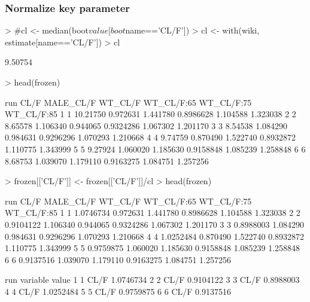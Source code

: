 \subsubsection{Normalize key parameter}
\begin{Schunk}
\begin{Sinput}
> #cl <- median(boot$value[boot$name=='CL/F'])
> cl <- with(wiki, estimate[name=='CL/F'])
> cl
\end{Sinput}
\begin{Soutput}
[1] 9.50754
\end{Soutput}
\begin{Sinput}
> head(frozen)
\end{Sinput}
\begin{Soutput}
  run     CL/F MALE_CL/F  WT_CL/F WT_CL/F:65 WT_CL/F:75 WT_CL/F:85
1   1 10.21750  0.972631 1.441780  0.8986628   1.104588   1.323038
2   2  8.65578  1.106340 0.944065  0.9324286   1.067302   1.201170
3   3  8.54538  1.084290 0.984631  0.9296296   1.070293   1.210668
4   4  9.74759  0.870490 1.522740  0.8932872   1.110775   1.343999
5   5  9.27924  1.060020 1.185630  0.9158848   1.085239   1.258848
6   6  8.68753  1.039070 1.179110  0.9163275   1.084751   1.257256
\end{Soutput}
\begin{Sinput}
> frozen[['CL/F']] <- frozen[['CL/F']]/cl
> head(frozen)
\end{Sinput}
\begin{Soutput}
  run      CL/F MALE_CL/F  WT_CL/F WT_CL/F:65 WT_CL/F:75 WT_CL/F:85
1   1 1.0746734  0.972631 1.441780  0.8986628   1.104588   1.323038
2   2 0.9104122  1.106340 0.944065  0.9324286   1.067302   1.201170
3   3 0.8988003  1.084290 0.984631  0.9296296   1.070293   1.210668
4   4 1.0252484  0.870490 1.522740  0.8932872   1.110775   1.343999
5   5 0.9759875  1.060020 1.185630  0.9158848   1.085239   1.258848
6   6 0.9137516  1.039070 1.179110  0.9163275   1.084751   1.257256
\end{Soutput}
\begin{Soutput}
  run variable     value
1   1     CL/F 1.0746734
2   2     CL/F 0.9104122
3   3     CL/F 0.8988003
4   4     CL/F 1.0252484
5   5     CL/F 0.9759875
6   6     CL/F 0.9137516
\end{Soutput}
\end{Schunk}
